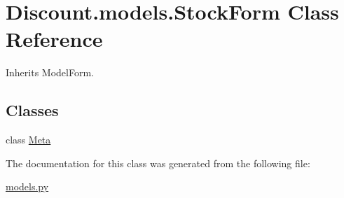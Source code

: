 \hypertarget{class_discount_1_1models_1_1_stock_form}{}\section{Discount.\+models.\+Stock\+Form Class Reference}
\label{class_discount_1_1models_1_1_stock_form}


Inherits Model\+Form.

\subsection*{Classes}
\begin{DoxyCompactItemize}
\item 
class \hyperlink{class_discount_1_1models_1_1_stock_form_1_1_meta}{Meta}
\end{DoxyCompactItemize}


The documentation for this class was generated from the following file\+:\begin{DoxyCompactItemize}
\item 
\hyperlink{models_8py}{models.\+py}\end{DoxyCompactItemize}
